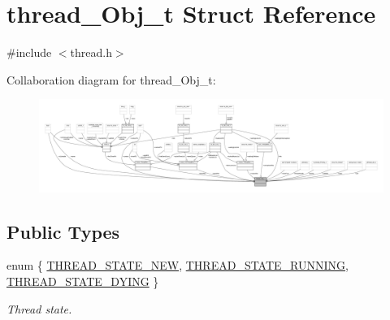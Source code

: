 \hypertarget{structthread___obj__t}{}\section{thread\+\_\+\+Obj\+\_\+t Struct Reference}
\label{structthread___obj__t}


{\ttfamily \#include $<$thread.\+h$>$}



Collaboration diagram for thread\+\_\+\+Obj\+\_\+t\+:
\nopagebreak
\begin{figure}[H]
\begin{center}
\leavevmode
\includegraphics[width=350pt]{structthread___obj__t__coll__graph}
\end{center}
\end{figure}
\subsection*{Public Types}
\begin{DoxyCompactItemize}
\item 
enum \{ \hyperlink{structthread___obj__t_a25079c9733844395e70d1434b0f9f474a02e3d4e4ad5c11cb279a2466596dd760}{T\+H\+R\+E\+A\+D\+\_\+\+S\+T\+A\+T\+E\+\_\+\+N\+EW}, 
\hyperlink{structthread___obj__t_a25079c9733844395e70d1434b0f9f474a9173045278a5bcb093301c2bf76e47fb}{T\+H\+R\+E\+A\+D\+\_\+\+S\+T\+A\+T\+E\+\_\+\+R\+U\+N\+N\+I\+NG}, 
\hyperlink{structthread___obj__t_a25079c9733844395e70d1434b0f9f474a89c7893996cdbf2fee33e380a39bfa3a}{T\+H\+R\+E\+A\+D\+\_\+\+S\+T\+A\+T\+E\+\_\+\+D\+Y\+I\+NG}
 \}\begin{DoxyCompactList}\small\item\em Thread state. \end{DoxyCompactList}
\end{DoxyCompactItemize}
